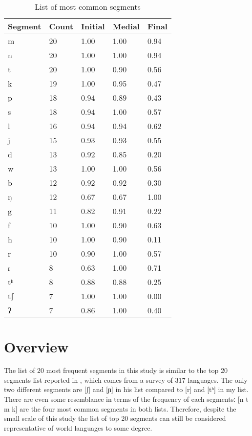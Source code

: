 \begin{table}[]
\centering
\caption{List of most common segments}
\label{tab:segment_list}
\begin{tabular}{|l|l|l|l|l|}
\hline
Segment & Count & Initial & Medial & Final \\ \hline
m        & 20    & 1.00    & 1.00   & 0.94  \\ \hline
n        & 20    & 1.00    & 1.00   & 0.94  \\ \hline
t        & 20    & 1.00    & 0.90   & 0.56  \\ \hline
k        & 19    & 1.00    & 0.95   & 0.47  \\ \hline
p        & 18    & 0.94    & 0.89   & 0.43  \\ \hline
s        & 18    & 0.94    & 1.00   & 0.57  \\ \hline
l        & 16    & 0.94    & 0.94   & 0.62  \\ \hline
j        & 15    & 0.93    & 0.93   & 0.55  \\ \hline
d        & 13    & 0.92    & 0.85   & 0.20  \\ \hline
w        & 13    & 1.00    & 1.00   & 0.56  \\ \hline
b        & 12    & 0.92    & 0.92   & 0.30  \\ \hline
ŋ        & 12    & 0.67    & 0.67   & 1.00  \\ \hline
g        & 11    & 0.82    & 0.91   & 0.22  \\ \hline
f        & 10    & 1.00    & 0.90   & 0.63  \\ \hline
h        & 10    & 1.00    & 0.90   & 0.11  \\ \hline
r        & 10    & 0.90    & 1.00   & 0.57  \\ \hline
ɾ        & 8     & 0.63    & 1.00   & 0.71  \\ \hline
tʰ       & 8     & 0.88    & 0.88   & 0.25  \\ \hline
tʃ       & 7     & 1.00    & 1.00   & 0.00  \\ \hline
ʔ        & 7     & 0.86    & 1.00   & 0.40  \\ \hline
\end{tabular}
\end{table}

\section{Overview}
The list of 20 most frequent segments in this study is similar to the top 20 segments list reported in \citet[45]{Gordon_2016}, which comes from a survey of 317 languages. The only two different segments are [ʃ] and [ɲ] in his list compared to [r] and [tʰ] in my list. There are even some resemblance in terms of the frequency of each segmentsː [n t m k] are the four most common segments in both lists. Therefore, despite the small scale of this study the list of top 20 segments can still be considered representative of world languages to some degree. 

